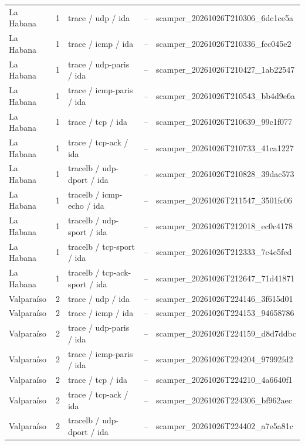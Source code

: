 \begin{longtable}{p{2cm}p{1.15cm}p{4.2cm}p{2.2cm}p{4.95cm}}
La Habana & 1 & trace / udp / ida & -- & scamper\_\allowbreak{}20261026T210306\_\allowbreak{}6dc1ce5a \\
La Habana & 1 & trace / icmp / ida & -- & scamper\_\allowbreak{}20261026T210336\_\allowbreak{}fcc045e2 \\
La Habana & 1 & trace / udp-paris / ida & -- & scamper\_\allowbreak{}20261026T210427\_\allowbreak{}1ab22547 \\
La Habana & 1 & trace / icmp-paris / ida & -- & scamper\_\allowbreak{}20261026T210543\_\allowbreak{}bb4d9e6a \\
La Habana & 1 & trace / tcp / ida & -- & scamper\_\allowbreak{}20261026T210639\_\allowbreak{}99c1f077 \\
La Habana & 1 & trace / tcp-ack / ida & -- & scamper\_\allowbreak{}20261026T210733\_\allowbreak{}41ca1227 \\
La Habana & 1 & tracelb / udp-dport / ida & -- & scamper\_\allowbreak{}20261026T210828\_\allowbreak{}39dac573 \\
La Habana & 1 & tracelb / icmp-echo / ida & -- & scamper\_\allowbreak{}20261026T211547\_\allowbreak{}3501fc06 \\
La Habana & 1 & tracelb / udp-sport / ida & -- & scamper\_\allowbreak{}20261026T212018\_\allowbreak{}ec0c4178 \\
La Habana & 1 & tracelb / tcp-sport / ida & -- & scamper\_\allowbreak{}20261026T212333\_\allowbreak{}7e4e5fcd \\
La Habana & 1 & tracelb / tcp-ack-sport / ida & -- & scamper\_\allowbreak{}20261026T212647\_\allowbreak{}71d41871 \\
Valparaíso & 2 & trace / udp / ida & -- & scamper\_\allowbreak{}20261026T224146\_\allowbreak{}3f615d01 \\
Valparaíso & 2 & trace / icmp / ida & -- & scamper\_\allowbreak{}20261026T224153\_\allowbreak{}94658786 \\
Valparaíso & 2 & trace / udp-paris / ida & -- & scamper\_\allowbreak{}20261026T224159\_\allowbreak{}d8d7ddbc \\
Valparaíso & 2 & trace / icmp-paris / ida & -- & scamper\_\allowbreak{}20261026T224204\_\allowbreak{}97992fd2 \\
Valparaíso & 2 & trace / tcp / ida & -- & scamper\_\allowbreak{}20261026T224210\_\allowbreak{}4a6640f1 \\
Valparaíso & 2 & trace / tcp-ack / ida & -- & scamper\_\allowbreak{}20261026T224306\_\allowbreak{}bf962aec \\
Valparaíso & 2 & tracelb / udp-dport / ida & -- & scamper\_\allowbreak{}20261026T224402\_\allowbreak{}a7e5a81c \\

\end{longtable}
